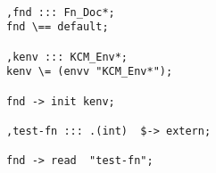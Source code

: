 \begin{lstlisting}[caption={Sample IDL Code},
  numbers = none, escapechar = !,
  label={lst:rz},
    basicstyle = \ttfamily\bfseries\footnotesize,
 linewidth = 1.01\linewidth]

,fnd ::: Fn_Doc*;
fnd \== default;

,kenv ::: KCM_Env*;
kenv \= (envv "KCM_Env*");

fnd -> init kenv;

,test-fn ::: .(int)  $-> extern;

fnd -> read  "test-fn";


\end{lstlisting}


